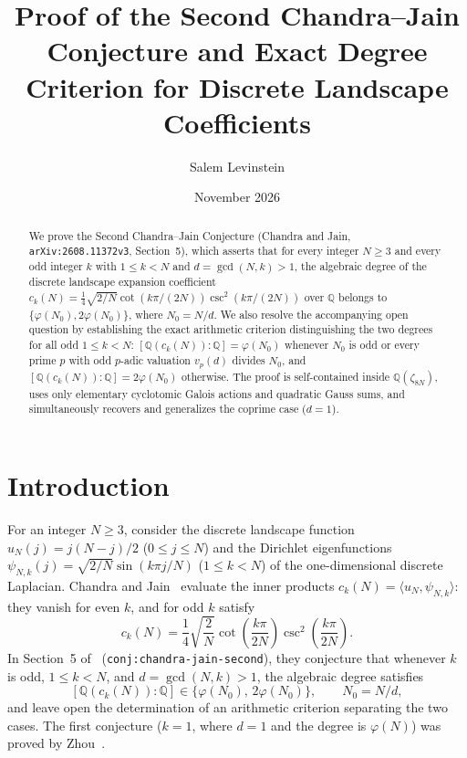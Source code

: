 \documentclass[11pt]{article}
\title{Proof of the Second Chandra--Jain Conjecture and Exact Degree Criterion for Discrete Landscape Coefficients}
\author{Salem Levinstein}
\date{November 2026}
\begin{document}
\maketitle

\begin{abstract}
We prove the Second Chandra--Jain Conjecture (Chandra and Jain, \texttt{arXiv:2608.11372v3}, Section~5), which asserts that for every integer $N \ge 3$ and every odd integer $k$ with $1 \le k < N$ and $d = \gcd(N,k) > 1$, the algebraic degree of the discrete landscape expansion coefficient $c_k(N) = \frac{1}{4}\sqrt{2/N}\cot(k\pi/(2N))\csc^2(k\pi/(2N))$ over $\mathbb{Q}$ belongs to $\{\varphi(N_0), 2\varphi(N_0)\}$, where $N_0 = N/d$. We also resolve the accompanying open question by establishing the exact arithmetic criterion distinguishing the two degrees for all odd $1 \le k < N$: $[\mathbb{Q}(c_k(N)) : \mathbb{Q}] = \varphi(N_0)$ whenever $N_0$ is odd or every prime $p$ with odd $p$-adic valuation $v_p(d)$ divides $N_0$, and $[\mathbb{Q}(c_k(N)) : \mathbb{Q}] = 2\varphi(N_0)$ otherwise. The proof is self-contained inside $\mathbb{Q}(\zeta_{8N})$, uses only elementary cyclotomic Galois actions and quadratic Gauss sums, and simultaneously recovers and generalizes the coprime case ($d = 1$).
\end{abstract}

\section{Introduction}

For an integer $N \ge 3$, consider the discrete landscape function $u_N(j) = j(N-j)/2$ ($0 \le j \le N$) and the Dirichlet eigenfunctions $\psi_{N,k}(j) = \sqrt{2/N}\sin(k\pi j / N)$ ($1 \le k < N$) of the one-dimensional discrete Laplacian. Chandra and Jain~\cite{ChandraJain2026} evaluate the inner products $c_k(N) = \langle u_N, \psi_{N,k} \rangle$: they vanish for even $k$, and for odd $k$ satisfy
\[
c_k(N) = \frac{1}{4}\sqrt{\frac{2}{N}}\cot\!\left(\frac{k\pi}{2N}\right)\csc^2\!\left(\frac{k\pi}{2N}\right).
\]
In Section~5 of~\cite{ChandraJain2026} (\texttt{conj:chandra-jain-second}), they conjecture that whenever $k$ is odd, $1 \le k < N$, and $d = \gcd(N,k) > 1$, the algebraic degree satisfies
\[
[\mathbb{Q}(c_k(N)) : \mathbb{Q}] \in \{\varphi(N_0),\, 2\varphi(N_0)\}, \qquad N_0 = N/d,
\]
and leave open the determination of an arithmetic criterion separating the two cases. The first conjecture ($k = 1$, where $d = 1$ and the degree is $\varphi(N)$) was proved by Zhou~\cite{Zhou2026}.
\end{document}
